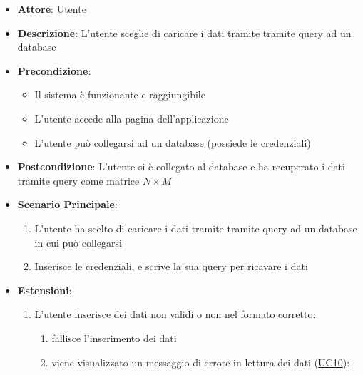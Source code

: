     \begin{itemize}
    \item \textbf{Attore}: Utente
    \item \textbf{Descrizione}: L'utente sceglie di caricare i dati tramite tramite query ad un database
    \item \textbf{Precondizione}:
    \begin{itemize}
        \item Il sistema è funzionante e raggiungibile
        \item L'utente accede alla pagina dell'applicazione
        \item L'utente può collegarsi ad un database (possiede le credenziali)
    \end{itemize}
    \item \textbf{Postcondizione}: L'utente si è collegato al database e ha recuperato i dati tramite query come matrice $N\times M$
    \item \textbf{Scenario Principale}: 
        \begin{enumerate}
            \item L'utente ha scelto di caricare i dati tramite tramite query ad un database in cui può collegarsi
            \item Inserisce le credenziali, e scrive la sua query per ricavare i dati
        \end{enumerate}
        \item \textbf{Estensioni}:
        \begin{enumerate}
            \item L'utente inserisce dei dati non validi o non nel formato corretto:
                \begin{enumerate}
                    \item fallisce l'inserimento dei dati
                    \item viene visualizzato un messaggio di errore in lettura dei dati (\hyperref[uc10]{UC10}):
                \end{enumerate}
        \end{enumerate}  
    \end{itemize}

    
